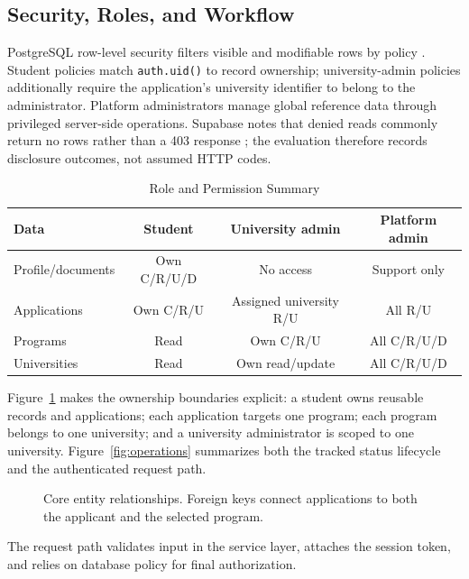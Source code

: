 \documentclass[conference,letterpaper]{IEEEtran}
\begin{document}
\subsection{Security, Roles, and Workflow}
PostgreSQL row-level security filters visible and modifiable rows by policy \cite{postgresql}. Student policies match \texttt{auth.uid()} to record ownership; university-admin policies additionally require the application's university identifier to belong to the administrator. Platform administrators manage global reference data through privileged server-side operations. Supabase notes that denied reads commonly return no rows rather than a 403 response \cite{supabase}; the evaluation therefore records disclosure outcomes, not assumed HTTP codes.

\begin{table}[!t]
\caption{Role and Permission Summary}
\label{tab:roles}
\centering\scriptsize
\setlength{\tabcolsep}{2.2pt}\renewcommand{\arraystretch}{1.05}
\begin{tabular}{@{}lccc@{}}
\toprule
Data & Student & University admin & Platform admin\\
\midrule
Profile/documents & Own C/R/U/D & No access & Support only\\
Applications & Own C/R/U & Assigned university R/U & All R/U\\
Programs & Read & Own C/R/U & All C/R/U/D\\
Universities & Read & Own read/update & All C/R/U/D\\
\bottomrule
\end{tabular}
\end{table}

Figure~\ref{fig:erd} makes the ownership boundaries explicit: a student owns reusable records and applications; each application targets one program; each program belongs to one university; and a university administrator is scoped to one university. Figure~\ref{fig:operations} summarizes both the tracked status lifecycle and the authenticated request path.

\begin{figure}[!t]
\centering
\resizebox{0.94\columnwidth}{!}{}
\caption{Core entity relationships. Foreign keys connect applications to both the applicant and the selected program.}
\label{fig:erd}
\end{figure}

The request path validates input in the service layer, attaches the session token, and relies on database policy for final authorization.
\end{document}
